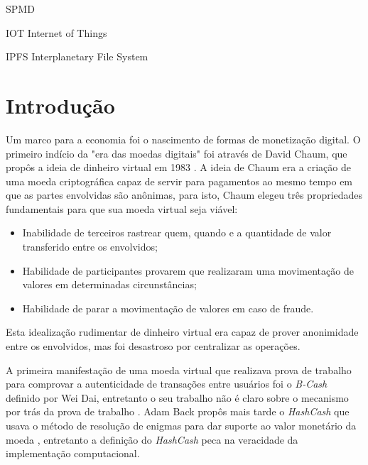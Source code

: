 \documentclass[tcc,capa]{texufpel}
\begin{document}
\listoffigures

\listoftables

\begin{listofabbrv}{SPMD}
        \item[IOT] Internet of Things
        \item[IPFS] Interplanetary File System
\end{listofabbrv}

\tableofcontents

\chapter{Introdução}

    Um marco para a economia foi o nascimento de formas de monetização digital. O primeiro indício da "era das moedas digitais" foi através de David Chaum, que propôs a ideia de dinheiro virtual em 1983 \cite{chaum1983blind}. A ideia de Chaum era a criação de uma moeda criptográfica capaz de servir para pagamentos ao mesmo tempo em que as partes envolvidas são anônimas, para isto, Chaum elegeu três propriedades fundamentais para que sua moeda virtual seja viável: 
	
	\begin{itemize}
	    \item Inabilidade de terceiros rastrear quem, quando e a quantidade de valor transferido entre os envolvidos;
	    \item Habilidade de participantes provarem que realizaram uma movimentação de valores em determinadas circunstâncias;
	    \item Habilidade de parar a movimentação de valores em caso de fraude.
	\end{itemize}
	
	Esta idealização rudimentar de dinheiro virtual era capaz de prover anonimidade entre os envolvidos, mas foi desastroso por centralizar as operações.
	
	A primeira manifestação de uma moeda virtual que realizava prova de trabalho para comprovar a autenticidade de transações entre usuários foi o \textit{B-Cash} definido por Wei Dai, entretanto o seu trabalho não é claro sobre o mecanismo por trás da prova de trabalho \cite{buterin2014next}. Adam Back propôs mais tarde o \textit{HashCash} que usava o método de resolução de enigmas para dar suporte ao valor monetário da moeda \cite{back2002hashcash}, entretanto a definição do \textit{HashCash} peca na veracidade da implementação computacional.
	
\end{document}
